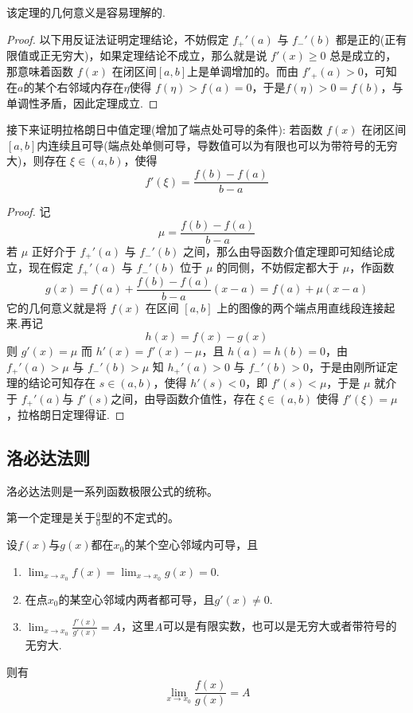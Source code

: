 该定理的几何意义是容易理解的.

\begin{proof}
 以下用反证法证明定理结论，不妨假定 $f_{+}'(a)$ 与 $f_-'(b)$ 都是正的(正有限值或正无穷大)，如果定理结论不成立，那么就是说 $f'(x) \geqslant 0$ 总是成立的，那意味着函数 $f(x)$ 在闭区间$[a,b]$上是单调增加的。而由 $f'_{+}(a) >0$，可知在$a$的某个右邻域内存在$\eta$使得 $f(\eta)>f(a)=0$，于是$f(\eta)>0=f(b)$，与单调性矛盾，因此定理成立. 
\end{proof}

接下来证明拉格朗日中值定理(增加了端点处可导的条件): 若函数 $f(x)$ 在闭区间$[a,b]$内连续且可导(端点处单侧可导，导数值可以为有限也可以为带符号的无穷大)，则存在 $\xi \in (a,b)$，使得
\[ f'(\xi) = \frac{f(b)-f(a)}{b-a} \]
\begin{proof}
  记
\[ \mu = \frac{f(b)-f(a)}{b-a} \]
若 $\mu$ 正好介于 $f_{+}'(a)$ 与 $f_-'(b)$ 之间，那么由导函数介值定理即可知结论成立，现在假定 $f_{+}'(a)$ 与 $f_-'(b)$ 位于 $\mu$ 的同侧，不妨假定都大于 $\mu$，作函数
\[ g(x) = f(a) +  \frac{f(b)-f(a)}{b-a} (x-a) = f(a) + \mu (x-a) \]
它的几何意义就是将 $f(x)$ 在区间 $[a,b]$ 上的图像的两个端点用直线段连接起来.再记
\[ h(x) = f(x) - g(x) \]
则 $g'(x) = \mu$ 而 $h'(x) = f'(x) - \mu$，且 $h(a)=h(b)=0$，由 $f_{+}'(a)>\mu$ 与 $f_-'(b)>\mu$ 知 $h_{+}'(a)>0$ 与 $f_-'(b)>0$，于是由刚所证定理的结论可知存在 $s \in (a,b)$，使得 $h'(s)<0$，即 $f'(s)<\mu$，于是 $\mu$ 就介于 $f_{+}'(a)$与 $f'(s)$之间，由导函数介值性，存在 $\xi \in (a,b)$ 使得 $f'(\xi) = \mu$，拉格朗日定理得证.
\end{proof}

\subsection{洛必达法则}
\label{sec:L'Hopital-rule}

洛必达法则是一系列函数极限公式的统称。

第一个定理是关于$\frac{0}{0}$型的不定式的。
\begin{theorem}
  设$f(x)$与$g(x)$都在$x_0$的某个空心邻域内可导，且
  \begin{enumerate}
  \item $\lim_{x \to x_0} f(x) = \lim_{x \to x_0} g(x) = 0$.
  \item 在点$x_0$的某空心邻域内两者都可导，且$g'(x) \neq 0$.
  \item $\lim_{x \to x_0} \frac{f'(x)}{g'(x)}=A$，这里$A$可以是有限实数，也可以是无穷大或者带符号的无穷大.
  \end{enumerate}
  则有
  \[ \lim_{x \to x_0} \frac{f(x)}{g(x)} = A \]
\end{theorem}

